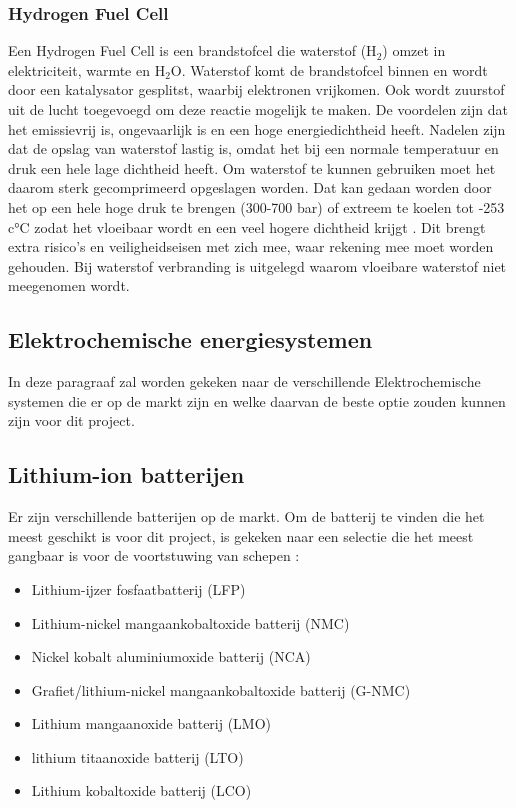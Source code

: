 \subsubsection{\textbf{Hydrogen Fuel Cell}}
Een Hydrogen Fuel Cell is een brandstofcel die waterstof (H$_2$) omzet in elektriciteit, warmte en H$_2$O. Waterstof komt de brandstofcel binnen en wordt door een katalysator gesplitst, waarbij elektronen vrijkomen. Ook wordt zuurstof uit de lucht toegevoegd om deze reactie mogelijk te maken. De voordelen zijn dat het emissievrij is, ongevaarlijk is en een hoge energiedichtheid heeft. Nadelen zijn dat de opslag van waterstof lastig is, omdat het bij een normale temperatuur en druk een hele lage dichtheid heeft. Om waterstof te kunnen gebruiken moet het daarom sterk gecomprimeerd opgeslagen worden. Dat kan gedaan worden door het op een hele hoge druk te brengen (300-700 bar) of extreem te koelen tot -253 c°C zodat het vloeibaar wordt en een veel hogere dichtheid krijgt \cite{EngineeringToolboxHydrogen}. Dit brengt extra risico's en veiligheidseisen met zich mee, waar rekening mee moet worden gehouden. Bij waterstof verbranding is uitgelegd waarom vloeibare waterstof niet meegenomen wordt.

\subsection{Elektrochemische energiesystemen}
In deze paragraaf zal worden gekeken naar de verschillende Elektrochemische systemen die er op de markt zijn en welke daarvan de beste optie zouden kunnen zijn voor dit project.


\subsection*{Lithium-ion batterijen}
Er zijn verschillende batterijen op de markt. Om de batterij te vinden die het meest geschikt is voor dit project, is gekeken naar een selectie die het meest gangbaar is voor de voortstuwing van schepen \cite{Szewczyk2023}:
\begin{itemize}
    \item Lithium-ijzer fosfaatbatterij (LFP)
    \item Lithium-nickel mangaankobaltoxide batterij (NMC)
    \item Nickel kobalt aluminiumoxide batterij (NCA)
    \item Grafiet/lithium-nickel mangaankobaltoxide batterij (G-NMC)
    \item Lithium mangaanoxide batterij (LMO)
    \item lithium titaanoxide batterij (LTO)
    \item Lithium kobaltoxide  batterij (LCO)
\end{itemize}

